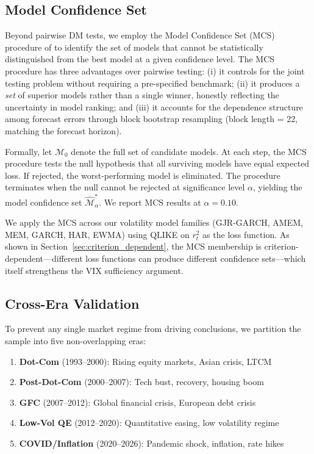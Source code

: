 \documentclass[12pt,a4paper]{article}
\begin{document}
\subsection{Model Confidence Set}
\label{sec:mcs}

Beyond pairwise DM tests, we employ the Model Confidence Set (MCS) procedure of \citet{hansen2011mcs} to identify the set of models that cannot be statistically distinguished from the best model at a given confidence level. The MCS procedure has three advantages over pairwise testing: (i) it controls for the joint testing problem without requiring a pre-specified benchmark; (ii) it produces a \emph{set} of superior models rather than a single winner, honestly reflecting the uncertainty in model ranking; and (iii) it accounts for the dependence structure among forecast errors through block bootstrap resampling (block length = 22, matching the forecast horizon).

Formally, let $\mathcal{M}_0$ denote the full set of candidate models. At each step, the MCS procedure tests the null hypothesis that all surviving models have equal expected loss. If rejected, the worst-performing model is eliminated. The procedure terminates when the null cannot be rejected at significance level $\alpha$, yielding the model confidence set $\hat{\mathcal{M}}^*_\alpha$. We report MCS results at $\alpha = 0.10$.

We apply the MCS across our volatility model families (GJR-GARCH, AMEM, MEM, GARCH, HAR, EWMA) using QLIKE on $r_t^2$ as the loss function. As shown in Section~\ref{sec:criterion_dependent}, the MCS membership is criterion-dependent---different loss functions can produce different confidence sets---which itself strengthens the VIX sufficiency argument.

\subsection{Cross-Era Validation}

To prevent any single market regime from driving conclusions, we partition the sample into five non-overlapping eras:

\begin{enumerate}
    \item \textbf{Dot-Com} (1993--2000): Rising equity markets, Asian crisis, LTCM
    \item \textbf{Post-Dot-Com} (2000--2007): Tech bust, recovery, housing boom
    \item \textbf{GFC} (2007--2012): Global financial crisis, European debt crisis
    \item \textbf{Low-Vol QE} (2012--2020): Quantitative easing, low volatility regime
    \item \textbf{COVID/Inflation} (2020--2026): Pandemic shock, inflation, rate hikes
\end{enumerate}
\end{document}
